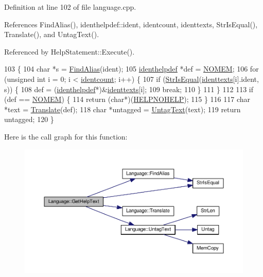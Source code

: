 Definition at line 102 of file language.\+cpp.



References Find\+Alias(), identhelpdef\+::ident, identcount, identtexts, Str\+Is\+Equal(), Translate(), and Untag\+Text().



Referenced by Help\+Statement\+::\+Execute().


\begin{DoxyCode}
103 \{
104     \textcolor{keywordtype}{char} *s = \hyperlink{classLanguage_a14a991ea42d5d0482911d459ee68e8be}{FindAlias}(ident);
105     \hyperlink{structidenthelpdef}{identhelpdef} *def = \hyperlink{platform_8h_a46ff2bfbf0d44b8466a2251d5bd5e6f8}{NOMEM};
106     \textcolor{keywordflow}{for} (\textcolor{keywordtype}{unsigned} \textcolor{keywordtype}{int} i = 0; i < \hyperlink{classLanguage_a470e68c0f7517f8f8ffa9ba315b52b0a}{identcount}; i++) \{
107         \textcolor{keywordflow}{if} (\hyperlink{clib_8h_a2a1f39d11cbbaac992d42e67557dac4b}{StrIsEqual}(\hyperlink{ident_8h_a86edb1ac19ff6f1a138bc71d5d57569a}{identtexts}[i].ident, s)) \{
108             def = (\hyperlink{structidenthelpdef}{identhelpdef}*)&\hyperlink{ident_8h_a86edb1ac19ff6f1a138bc71d5d57569a}{identtexts}[i];
109             \textcolor{keywordflow}{break};
110         \}
111     \}
112 
113     \textcolor{keywordflow}{if} (def == \hyperlink{platform_8h_a46ff2bfbf0d44b8466a2251d5bd5e6f8}{NOMEM}) \{
114         \textcolor{keywordflow}{return} (\textcolor{keywordtype}{char}*)(\hyperlink{text_8h_a45a20702609f9cc519f35b0d9358a2f3}{HELPNOHELP});
115     \}
116 
117     \textcolor{keywordtype}{char} *text = \hyperlink{classLanguage_ae4515a9a4191e57c5ccab61e99687818}{Translate}(def);
118     \textcolor{keywordtype}{char} *untagged = \hyperlink{classLanguage_a69c5b3269ec8570a2f8f28e8e632cf44}{UntagText}(text);
119     \textcolor{keywordflow}{return} untagged;
120 \}
\end{DoxyCode}


Here is the call graph for this function\+:
\nopagebreak
\begin{figure}[H]
\begin{center}
\leavevmode
\includegraphics[width=350pt]{d0/d41/classLanguage_a0044feceac32f8ce943b88165ade965e_cgraph}
\end{center}
\end{figure}




